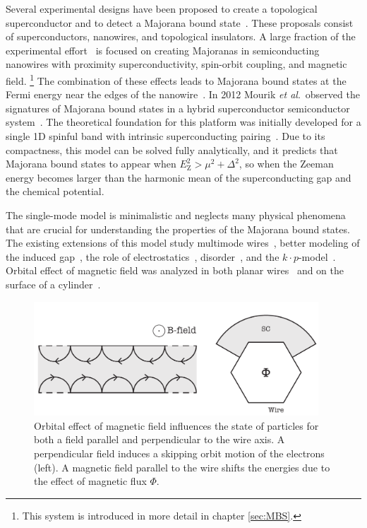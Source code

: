 Several experimental designs have been proposed to create a topological superconductor and to detect a Majorana bound state~\cite{Kitaev2001,Leijnse2012,Beenakker2013,Alicea2012}.
These proposals consist of superconductors, nanowires, and topological insulators.
A large fraction of the experimental effort~\cite{Mourik2012,Das2012,Deng2012,Churchill2013,Deng2014} is focused on creating Majoranas in semiconducting nanowires with proximity superconductivity, spin-orbit coupling, and magnetic field.
\footnote{This system is introduced in more detail in chapter \ref{sec:MBS}.}
The combination of these effects leads to Majorana bound states at the Fermi energy near the edges of the nanowire~\cite{Oreg2010,Lutchyn2010}.
In 2012 Mourik\textit{ et al}.~observed the signatures of Majorana bound states in a hybrid superconductor semiconductor system~\cite{Mourik2012}.
The theoretical foundation for this platform was initially developed for a single 1D spinful band with intrinsic superconducting pairing~\cite{Lutchyn2010,Oreg2010}.
Due to its compactness, this model can be solved fully analytically, and it predicts that Majorana bound states to appear when $E_{\textrm{Z}}^{2}>\mu^{2}+\Delta^{2}$, so when the Zeeman energy becomes larger than the harmonic mean of the superconducting gap and the chemical potential.

The single-mode model is minimalistic and neglects many physical phenomena that are crucial for understanding the properties of the Majorana bound states.
The existing extensions of this model study multimode wires~\cite{Potter2010a}, better modeling of the induced gap~\cite{Liu2012,Stanescu2014}, the role of electrostatics~\cite{Vuik2016}, disorder~\cite{Potter2012,Pientka2012,Adagideli2014}, and the $k\cdot p$-model~\cite{Stanescu2013a}.
Orbital effect of magnetic field was analyzed in both planar wires~\cite{Osca2015a,Lim2012} and on the surface of a cylinder~\cite{SooLim2013}.

\begin{figure}
\begin{centering}
\includegraphics[width=0.95\textwidth]{chapter_introduction/figures/wires.pdf}
\par\end{centering}
\caption{Orbital effect of magnetic field influences the state of particles for both a field parallel and perpendicular to the wire axis.
A perpendicular field induces a skipping orbit motion of the electrons (left).
A magnetic field parallel to the wire shifts the energies due to the effect of magnetic flux $\Phi$.
\label{fig:wire}}
\end{figure}

